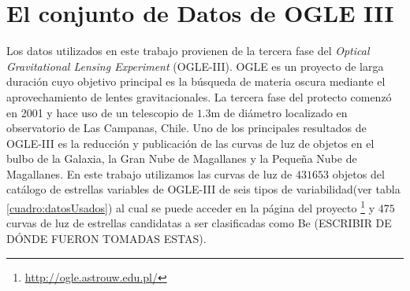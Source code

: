 \documentclass[letterpaper,12pt]{book}
\begin{document}
\chapter{El conjunto de Datos de OGLE III\label{cap:losDatos}}

Los datos utilizados en este trabajo provienen de la tercera fase del \textit{Optical Gravitational Lensing Experiment} (OGLE-III). OGLE es un proyecto de larga duración cuyo objetivo principal es la búsqueda de materia oscura mediante el aprovechamiento de lentes gravitacionales. La tercera fase del protecto comenzó en 2001 y hace uso de un telescopio de $1.3$m de diámetro localizado en observatorio de Las Campanas, Chile\cite{udalski_optical_2004}. Uno de los principales resultados de OGLE-III es la reducción\cite{udalski_optical_2008} y publicación de las curvas de luz de objetos en el bulbo de la Galaxia, la Gran Nube de Magallanes y la Pequeña Nube de Magallanes. En este trabajo utilizamos las curvas de luz de $431 653$ objetos del catálogo de estrellas variables de OGLE-III de seis tipos de variabilidad(ver tabla \ref{cuadro:datosUsados}) al cual se puede acceder en la página del proyecto \footnote{\url{http://ogle.astrouw.edu.pl/}} y $475$ curvas de luz de estrellas candidatas a ser clasificadas como Be (ESCRIBIR DE DÓNDE FUERON TOMADAS ESTAS).
\end{document}
